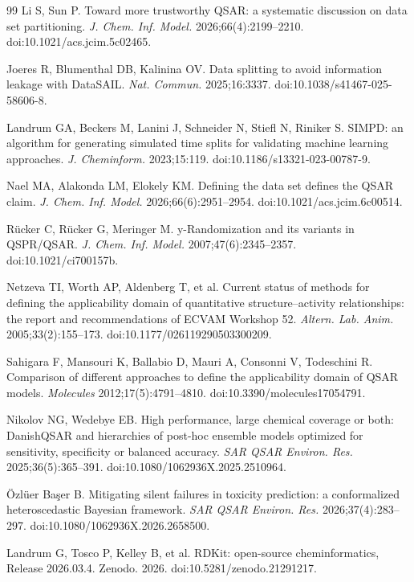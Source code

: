\begin{thebibliography}{99}
Li S, Sun P. Toward more trustworthy QSAR: a systematic discussion on data set partitioning. \textit{J. Chem. Inf. Model.} 2026;66(4):2199--2210. doi:10.1021/acs.jcim.5c02465.

Joeres R, Blumenthal DB, Kalinina OV. Data splitting to avoid information leakage with DataSAIL. \textit{Nat. Commun.} 2025;16:3337. doi:10.1038/s41467-025-58606-8.

Landrum GA, Beckers M, Lanini J, Schneider N, Stiefl N, Riniker S. SIMPD: an algorithm for generating simulated time splits for validating machine learning approaches. \textit{J. Cheminform.} 2023;15:119. doi:10.1186/s13321-023-00787-9.

Nael MA, Alakonda LM, Elokely KM. Defining the data set defines the QSAR claim. \textit{J. Chem. Inf. Model.} 2026;66(6):2951--2954. doi:10.1021/acs.jcim.6c00514.

Rücker C, Rücker G, Meringer M. y-Randomization and its variants in QSPR/QSAR. \textit{J. Chem. Inf. Model.} 2007;47(6):2345--2357. doi:10.1021/ci700157b.

Netzeva TI, Worth AP, Aldenberg T, et al. Current status of methods for defining the applicability domain of quantitative structure--activity relationships: the report and recommendations of ECVAM Workshop 52. \textit{Altern. Lab. Anim.} 2005;33(2):155--173. doi:10.1177/026119290503300209.

Sahigara F, Mansouri K, Ballabio D, Mauri A, Consonni V, Todeschini R. Comparison of different approaches to define the applicability domain of QSAR models. \textit{Molecules} 2012;17(5):4791--4810. doi:10.3390/molecules17054791.

Nikolov NG, Wedebye EB. High performance, large chemical coverage or both: DanishQSAR and hierarchies of post-hoc ensemble models optimized for sensitivity, specificity or balanced accuracy. \textit{SAR QSAR Environ. Res.} 2025;36(5):365--391. doi:10.1080/1062936X.2025.2510964.

Özlüer Başer B. Mitigating silent failures in toxicity prediction: a conformalized heteroscedastic Bayesian framework. \textit{SAR QSAR Environ. Res.} 2026;37(4):283--297. doi:10.1080/1062936X.2026.2658500.

Landrum G, Tosco P, Kelley B, et al. RDKit: open-source cheminformatics, Release 2026.03.4. Zenodo. 2026. doi:10.5281/zenodo.21291217.


\end{thebibliography}
